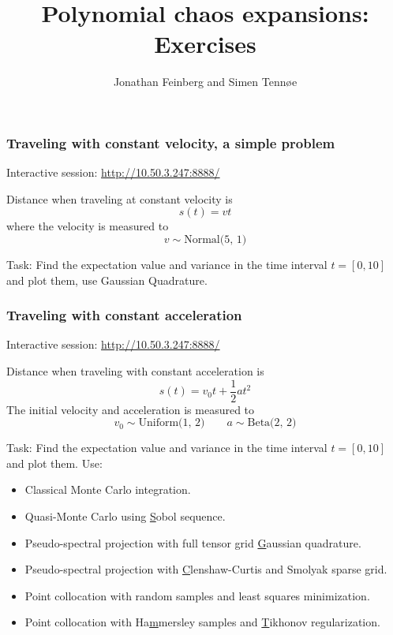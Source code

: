 \documentclass{beamer}
\title{Polynomial chaos expansions: Exercises}
\author{Jonathan Feinberg and Simen Tennøe}
\begin{document}
\begin{frame}
  \maketitle
\end{frame}


\begin{frame}
\frametitle{Traveling with constant velocity, a simple problem}
   \begin{alert}{Interactive session:}
\href{http://10.50.3.247:8888/}{http://10.50.3.247:8888/}\newline
  \end{alert}
  
  
 Distance when traveling at constant velocity is
\[s(t) = vt\]
\pause
where the velocity is measured to
\[v \sim \text{Normal(5, 1)}\]
\pause
\begin{alert}{Task:}
 Find the expectation value and variance in the time interval $t=[0,10]$  and plot them, use Gaussian Quadrature.
\end{alert}

\end{frame}

\begin{frame}
\frametitle{Traveling with constant acceleration}
\scriptsize
   \begin{alert}{Interactive session:}
\href{http://10.50.3.247:8888/}{http://10.50.3.247:8888/}\newline
  \end{alert}
  
  


 Distance when traveling with constant acceleration is
 \[s(t) = v_0t + \frac{1}{2}at^2\]
\pause
The initial velocity and acceleration is measured to
\[v_0 \sim \text{Uniform(1, 2)} \qquad a \sim \text{Beta(2, 2)}\]
\pause
\begin{alert}{Task:}
Find the expectation value and variance in the time interval $t=[0,10]$  and plot them. Use:
\begin{itemize}
    \item Classical Monte Carlo integration.
    \item Quasi-Monte Carlo using \underline{S}obol sequence.
    \item Pseudo-spectral projection with full tensor grid \underline{G}aussian quadrature.
    \item Pseudo-spectral projection with \underline{C}lenshaw-Curtis and Smolyak sparse grid.
    \item Point collocation with random samples and least squares
        minimization.
    \item Point collocation with Ha\underline{m}mersley samples and \underline{T}ikhonov regularization.
\end{itemize}
\end{alert}
\end{frame}
\end{document}
